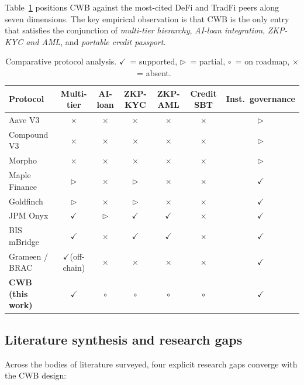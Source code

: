 \documentclass[12pt,a4paper]{report}
\newcommand{\tmarkDone}{$\checkmark$}
\newcommand{\tmarkNo}{$\times$}
\newcommand{\tmarkPartial}{$\triangleright$}
\newcommand{\tmarkPlanned}{$\circ$}
\begin{document}
Table~\ref{tab:comparative} positions CWB against the most-cited DeFi and TradFi peers along seven dimensions. The key empirical observation is that CWB is the only entry that satisfies the conjunction of \textit{multi-tier hierarchy}, \textit{AI-loan integration}, \textit{ZKP-KYC and AML}, and \textit{portable credit passport}.

\begin{table}[!t]
\centering
\caption{Comparative protocol analysis. \tmarkDone\ = supported, \tmarkPartial\ = partial, \tmarkPlanned\ = on roadmap, \tmarkNo\ = absent.}
\label{tab:comparative}
\small
\setlength{\tabcolsep}{4pt}
\begin{tabularx}{\linewidth}{@{}p{2.0cm}cccccc@{}}
\toprule
\textbf{Protocol} & \textbf{Multi-tier} & \textbf{AI-loan} & \textbf{ZKP-KYC} & \textbf{ZKP-AML} & \textbf{Credit SBT} & \textbf{Inst.\ governance} \\
\midrule
Aave V3 & \tmarkNo & \tmarkNo & \tmarkNo & \tmarkNo & \tmarkNo & \tmarkPartial \\
Compound V3 & \tmarkNo & \tmarkNo & \tmarkNo & \tmarkNo & \tmarkNo & \tmarkPartial \\
Morpho & \tmarkNo & \tmarkNo & \tmarkNo & \tmarkNo & \tmarkNo & \tmarkPartial \\
Maple Finance & \tmarkPartial & \tmarkNo & \tmarkPartial & \tmarkNo & \tmarkNo & \tmarkDone \\
Goldfinch & \tmarkPartial & \tmarkNo & \tmarkPartial & \tmarkNo & \tmarkNo & \tmarkDone \\
JPM Onyx & \tmarkDone & \tmarkPartial & \tmarkDone & \tmarkDone & \tmarkNo & \tmarkDone \\
BIS mBridge & \tmarkDone & \tmarkNo & \tmarkDone & \tmarkDone & \tmarkNo & \tmarkDone \\
Grameen / BRAC & \tmarkDone (off-chain) & \tmarkNo & \tmarkNo & \tmarkNo & \tmarkNo & \tmarkDone \\
\textbf{CWB (this work)} & \tmarkDone & \tmarkPlanned & \tmarkPlanned & \tmarkPlanned & \tmarkPlanned & \tmarkDone \\
\bottomrule
\end{tabularx}
\end{table}

\subsection{Literature synthesis and research gaps}
\label{sec:lit-synthesis}
Across the bodies of literature surveyed, four explicit research gaps converge with the CWB design:
\end{document}
